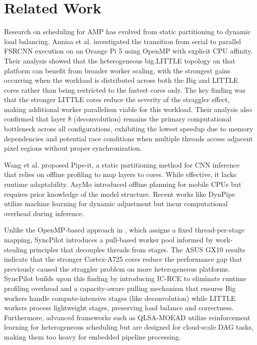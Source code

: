 \documentclass[runningheads]{llncs}
\begin{document}
\section{Related Work}

Research on scheduling for AMP has evolved from static partitioning to dynamic load balancing. Annisa et al. \cite{annisa2025fsrcnn} investigated the transition from serial to parallel FSRCNN execution on an Orange Pi 5 using OpenMP with explicit CPU affinity. Their analysis showed that the heterogeneous big.LITTLE topology on that platform can benefit from broader worker scaling, with the strongest gains occurring when the workload is distributed across both the Big and LITTLE cores rather than being restricted to the fastest cores only. The key finding was that the stronger LITTLE cores reduce the severity of the straggler effect, making additional worker parallelism viable for this workload. Their analysis also confirmed that layer 8 (deconvolution) remains the primary computational bottleneck across all configurations, exhibiting the lowest speedup due to memory dependencies and potential race conditions when multiple threads access adjacent pixel regions without proper synchronization.

Wang et al. \cite{wang2020pipeit} proposed Pipe-it, a static partitioning method for CNN inference that relies on offline profiling to map layers to cores. While effective, it lacks runtime adaptability. AsyMo \cite{wang2021asymo} introduced offline planning for mobile CPUs but requires prior knowledge of the model structure. Recent works like DynPipe \cite{yuan2025dynpipe} utilize machine learning for dynamic adjustment but incur computational overhead during inference.

Unlike the OpenMP-based approach in \cite{annisa2025fsrcnn}, which assigns a fixed thread-per-stage mapping, SyncPilot introduces a pull-based worker pool informed by work-stealing principles \cite{adnan2023array} that decouples threads from stages. The ASUS GX10 results indicate that the stronger Cortex-A725 cores reduce the performance gap that previously caused the straggler problem on more heterogeneous platforms. SyncPilot builds upon this finding by introducing IC-RCE to eliminate runtime profiling overhead and a capacity-aware pulling mechanism that ensures Big workers handle compute-intensive stages (like deconvolution) while LITTLE workers process lightweight stages, preserving load balance and correctness. Furthermore, advanced frameworks such as QLSA-MOEAD \cite{saad2026qlsa} utilize reinforcement learning for heterogeneous scheduling but are designed for cloud-scale DAG tasks, making them too heavy for embedded pipeline processing.
\end{document}
